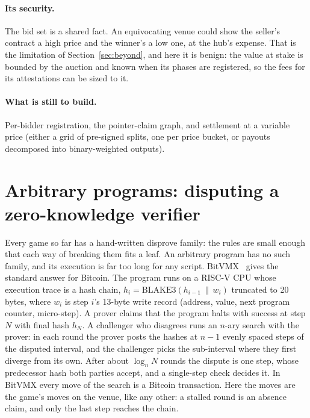 \documentclass[11pt]{article}
\begin{document}
\paragraph{Its security.} The bid set is a shared fact. An equivocating
venue could show the seller's contract a high price and the winner's a
low one, at the hub's expense. That is the limitation of
Section~\ref{sec:beyond}, and here it is benign: the value at stake is
bounded by the auction and known when its phases are registered, so the
fees for its attestations can be sized to it.

\paragraph{What is still to build.} Per-bidder registration, the pointer-claim
graph, and settlement at a variable price (either a grid of pre-signed
splits, one per price bucket, or payouts decomposed into binary-weighted
outputs).

\section{Arbitrary programs: disputing a zero-knowledge verifier}
\label{sec:zk}

Every game so far has a hand-written disprove family: the rules are
small enough that each way of breaking them fits a leaf. An arbitrary
program has no such family, and its execution is far too long for any
script. BitVMX~\cite{bitvmx} gives the standard answer for Bitcoin. The
program runs on a RISC-V CPU whose execution trace is a hash chain,
$h_i = \mathrm{BLAKE3}(h_{i-1} \,\|\, w_i)$ truncated to 20 bytes, where
$w_i$ is step $i$'s 13-byte write record (address, value, next program
counter, micro-step). A prover claims that the program halts with
success at step $N$ with final hash $h_N$. A challenger who disagrees
runs an $n$-ary search with the prover: in each round the prover posts
the hashes at $n-1$ evenly spaced steps of the disputed interval, and the
challenger picks the sub-interval where they first diverge from its own.
After about $\log_n N$ rounds the dispute is one step, whose predecessor
hash both parties accept, and a single-step check decides it. In
BitVMX every move of the search is a Bitcoin transaction. Here the
moves are the game's moves on the venue, like any other: a stalled
round is an absence claim, and only the last step reaches the chain.
\end{document}
